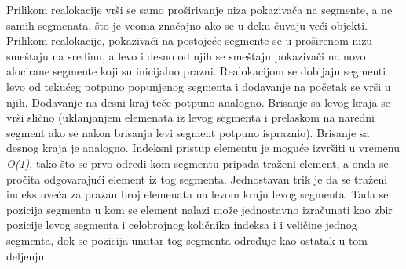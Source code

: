 \documentclass{article}
\begin{document}
Prilikom realokacije vrši se samo proširivanje niza pokazivača na segmente, a ne
samih segmenata, što je veoma značajno ako se u deku čuvaju veći objekti. Prilikom
realokacije, pokazivači na postojeće segmente se u proširenom nizu smeštaju na
sredinu, a levo i desno od njih se smeštaju pokazivači na novo alocirane segmente
koji su inicijalno prazni. Realokacijom se dobijaju segmenti levo od tekućeg
potpuno popunjenog segmenta i dodavanje na početak se vrši u njih. Dodavanje na desni kraj teče potpuno analogno.
Brisanje sa levog kraja se vrši slično (uklanjanjem elemenata iz levog segmenta
i prelaskom na naredni segment ako se nakon brisanja levi segment potpuno
ispraznio). Brisanje sa desnog kraja je analogno.
Indeksni pristup elementu je moguće izvršiti u vremenu \textit{O(1)}, tako što se prvo
odredi kom segmentu pripada traženi element, a onda se pročita odgovarajući
element iz tog segmenta. Jednostavan trik je da se traženi indeks uveća za prazan
broj elemenata na levom kraju levog segmenta. Tada se pozicija segmenta u kom
se element nalazi može jednostavno izračunati kao zbir pozicije levog segmenta i
celobrojnog količnika indeksa i i veličine jednog segmenta, dok se pozicija unutar
tog segmenta određuje kao ostatak u tom deljenju.
\end{document}
